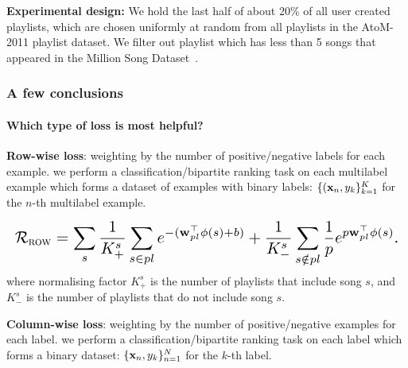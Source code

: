 {\bf Experimental design:}
We hold the last half of about 20\% of all user created playlists, 
which are chosen uniformly at random from all playlists in the AtoM-2011 playlist dataset.
We filter out playlist which has less than 5 songs that appeared in the Million Song Dataset~\cite{}.


\subsubsection{A few conclusions}
\begin{table}[!h]
\centering
\caption{Statistics of dataset}
\end{table}


\paragraph{Which type of loss is most helpful?}

{\bf Row-wise loss}: weighting by the number of positive/negative labels for each example.
\ie we perform a classification/bipartite ranking task on each multilabel example 
which forms a dataset of examples with binary labels: $\{(\mathbf{x}_n, y_k\}_{k=1}^K$ for the $n$-th multilabel example.

\begin{equation*}
\resizebox{\linewidth}{!}{$
\RCal_\textsc{row} 
= \displaystyle \sum_s 
  \frac{1}{K_+^s} \sum_{s \in pl} e^{-(\w_{pl}^\top \phi(s) + b)} +
  \frac{1}{K_-^s} \sum_{s \notin pl} \frac{1}{p} e^{p \w_{pl}^\top \phi(s)}.
$}
\end{equation*}
where normalising factor $K_+^s$ is the number of playlists that include song $s$,
and $K_-^s$ is the number of playlists that do not include song $s$.


{\bf Column-wise loss}: weighting by the number of positive/negative examples for each label.
\ie we perform a classification/bipartite ranking task on each label which forms a binary dataset:
$\{\mathbf{x}_n, y_k\}_{n=1}^N$ for the $k$-th label.

